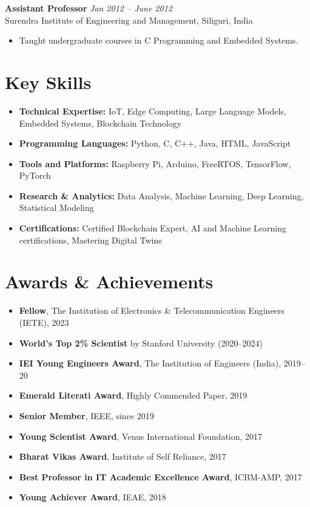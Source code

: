 \documentclass[10pt,a4paper]{article}
\begin{document}
	\textbf{Assistant Professor} \hfill \textit{Jan 2012 -- June 2012}\\
	Surendra Institute of Engineering and Management, Siliguri, India
	\begin{itemize}[leftmargin=0.2in]
		\item Taught undergraduate courses in C Programming and Embedded Systems.
	\end{itemize}
	
	\section*{Key Skills}
	
	\begin{itemize}[leftmargin=0.15in]
		\item \textbf{Technical Expertise:} IoT, Edge Computing, Large Language Models, Embedded Systems, Blockchain Technology
		\item \textbf{Programming Languages:} Python, C, C++, Java, HTML, JavaScript
		\item \textbf{Tools and Platforms:} Raspberry Pi, Arduino, FreeRTOS, TensorFlow, PyTorch
		\item \textbf{Research \& Analytics:} Data Analysis, Machine Learning, Deep Learning, Statistical Modeling
		\item \textbf{Certifications:} Certified Blockchain Expert, AI and Machine Learning certifications, Mastering Digital Twins
	\end{itemize}
	
	\section*{Awards \& Achievements}
	
	\begin{itemize}[leftmargin=0.15in]
		\item \textbf{Fellow}, The Institution of Electronics \& Telecommunication Engineers (IETE), 2023
		\item \textbf{World's Top 2\% Scientist} by Stanford University (2020--2024)
		\item \textbf{IEI Young Engineers Award}, The Institution of Engineers (India), 2019--20
		\item \textbf{Emerald Literati Award}, Highly Commended Paper, 2019
		\item \textbf{Senior Member}, IEEE, since 2019
		\item \textbf{Young Scientist Award}, Venus International Foundation, 2017
		\item \textbf{Bharat Vikas Award}, Institute of Self Reliance, 2017
		\item \textbf{Best Professor in IT Academic Excellence Award}, ICBM-AMP, 2017
		\item \textbf{Young Achiever Award}, IEAE, 2018
	\end{itemize}
	
\end{document}
